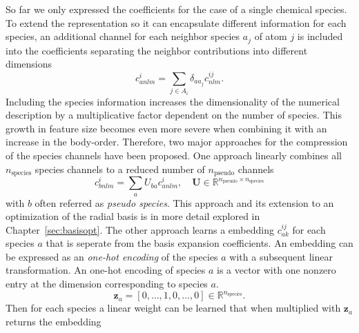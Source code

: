 So far we only expressed the coefficients for the case of a single chemical species.
To extend the representation so it can encapsulate different information for each species, an additional channel for each neighbor species $a_j$ of atom $j$ is included into the coefficients separating the neighbor contributions into different dimensions
\begin{equation}
  \label{eq:chemical_decomposition}
  c^{i}_{anlm} = \sum_{j\in A_i} \delta_{aa_j}c^{ij}_{nlm}.
\end{equation}
Including the species information increases the dimensionality of the numerical description by a multiplicative factor dependent on the number of species.
This growth in feature size becomes even more severe when combining it with an increase in the body-order.
Therefore, two major approaches for the compression of the species channels have been proposed.
One approach linearly combines all $n_{\text{species}}$ species channels to a reduced number of $n_{\text{pseudo}}$ channels~\cite{willatt2018feature,lopanitsyna2023modeling}
\begin{equation}
  \label{eq:pseudo_species}
  c^{i}_{bnlm} = \sum_a U_{ba}c^{i}_{anlm}, \quad \mathbf{U}\in\mathbb{R}^{n_\text{pseudo}\times n_\text{species}}
\end{equation}
with $b$ often referred as \emph{pseudo species}.
This approach and its extension to an optimization of the radial basis is in more detail explored in Chapter~\ref{sec:basisopt}.
The other approach learns a embedding $c^{ij}_{ak}$ for each species $a$ that is seperate from the basis expansion coefficients.
An embedding can be expressed as an \emph{one-hot encoding} of the species $a$ with a subsequent linear transformation.
An one-hot encoding of species $a$ is a vector with one nonzero entry at the dimension corresponding to species $a$.
\begin{equation}
  \mathbf{z}_a = [0,\ldots, 1, 0,\ldots, 0]\in\mathbb{R}^{n_\text{species}}.
\end{equation}
Then for each species a linear weight can be learned that when multiplied with $\mathbf{z}_a$ returns the embedding
